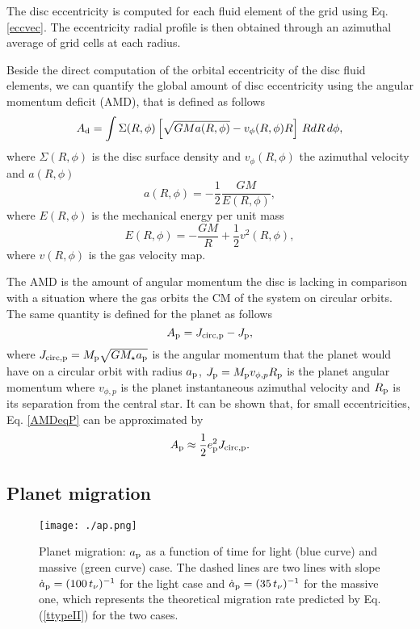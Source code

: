 \documentclass[usenatbib,a4paper,times,fleqn]{mnras}
\begin{document}
The disc eccentricity is computed for each fluid element of the grid using Eq. \ref{eccvec}. The eccentricity radial profile is then obtained through an azimuthal average of grid cells at each radius. 

Beside the direct computation of the orbital eccentricity of the disc fluid elements, we can quantify the global amount of disc eccentricity using the angular momentum deficit (AMD), that is defined as follows
\begin{equation}
A_{\rm d}=\int \Sigma(R,\phi) \left[\sqrt{GMa(R,\phi)}- v_\phi(R,\phi) R\right]\, R dR \, d\phi,\label{AMDeq}
\end{equation}
where $\Sigma(R,\phi)$ is the disc surface density and $v_\phi(R,\phi)$ the azimuthal velocity and $a(R,\phi)$
\begin{equation}
a(R,\phi)=-\frac{1}{2}\frac{GM}{E(R,\phi)},
\end{equation}
where $E(R,\phi)$ is the mechanical energy per unit mass 
\begin{equation}
E(R,\phi)=-\frac{GM}{R}+\frac{1}{2}v^2(R,\phi),
\end{equation}
where $v(R,\phi)$ is the gas velocity map.

The AMD is the amount of angular momentum the disc is lacking in comparison with a situation where the gas orbits the CM of the system on circular orbits.
The same quantity is defined for the planet as follows
\begin{equation}
A_{\rm p}=J_{\rm circ,p}-J_{\rm p},\label{AMDeqP}
\end{equation}
where $J_{\rm circ,p}=M_{\rm p}\sqrt{GM_\star a_{\rm p}}$ is the angular momentum that the planet would have on a circular orbit with radius $a_{\rm p}$, $J_{\rm p}=M_{\rm p}v_{\phi,p}R_{\rm p}$ is the planet angular momentum where $v_{\phi,p}$ is the planet instantaneous azimuthal velocity and $R_{\rm p}$ is its separation from the central star. It can be shown that, for small eccentricities, Eq. \ref{AMDeqP} can be approximated by
\begin{equation}
A_{\rm p}\approx \frac{1}{2}e_{\rm p}^2J_{\rm circ,p}.\label{AMDappr}
\end{equation}

\subsection{Planet migration}

\begin{figure}
\begin{center}
\texttt{[image: ./ap.png]}
\caption{Planet migration: $a_{\rm p}$ as a function of time for light (blue curve) and massive (green curve) case. The dashed lines are two lines with slope $\dot{a}_{\rm p}=( 100\, t_\nu)^{-1}$ for the light case and $\dot{a}_{\rm p}= (35 \,t_\nu)^{-1}$ for the massive one, which represents the theoretical migration rate predicted by Eq. (\ref{ttypeII}) for the two cases.}
\label{fig:migration}
\end{center}
\end{figure}
\end{document}
